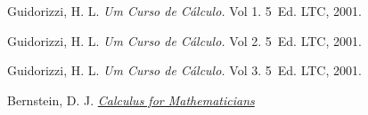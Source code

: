 \documentclass[11pt, oneside, a4paper]{gsm-l}
\begin{document}


\begin{thebibliography}{99}

 Guidorizzi, H. L. {\sl Um Curso de Cálculo.} Vol 1. 5\textordfeminine\ Ed. LTC, 2001.

 Guidorizzi, H. L. {\sl Um Curso de Cálculo.} Vol 2. 5\textordfeminine\ Ed. LTC, 2001.

 Guidorizzi, H. L. {\sl Um Curso de Cálculo.} Vol 3. 5\textordfeminine\ Ed. LTC, 2001.

 Bernstein, D. J. \href{http://cr.yp.to/papers/calculus.pdf}{{\sl Calculus for Mathematicians}}

\end{thebibliography}

\printindex
\end{document}
